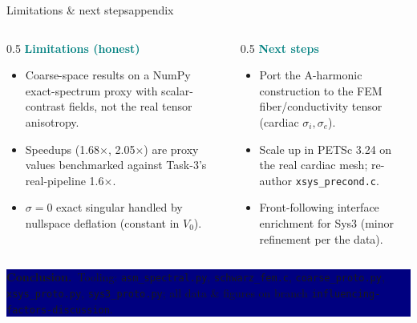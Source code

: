 \documentclass[aspectratio=169,9pt]{beamer}
\newcommand{\concl}[1]{\vfill\noindent\colorbox{navy}{\parbox{\dimexpr\textwidth-2\fboxsep\relax}{\color{white}\footnotesize\textbf{Conclusion.}\ #1}}}
\begin{document}
\begin{frame}{Limitations \& next steps}{appendix}
  \begin{columns}[T]
  \begin{column}{0.5\linewidth}\footnotesize
   \textcolor{teal}{\textbf{Limitations (honest)}}
   \begin{itemize}\setlength\itemsep{0.3em}
     \item Coarse-space results on a NumPy exact-spectrum proxy with scalar-contrast fields, not the real tensor anisotropy.
     \item Speedups (1.68$\times$, 2.05$\times$) are proxy values benchmarked against Task-3's real-pipeline 1.6$\times$.
     \item $\sigma{=}0$ exact singular handled by nullspace deflation (constant in $V_0$).
   \end{itemize}
  \end{column}
  \begin{column}{0.5\linewidth}\footnotesize
   \textcolor{teal}{\textbf{Next steps}}
   \begin{itemize}\setlength\itemsep{0.3em}
     \item Port the A-harmonic construction to the FEM fiber/conductivity tensor (cardiac $\sigma_i,\sigma_e$).
     \item Scale up in PETSc 3.24 on the real cardiac mesh; re-author \texttt{xsys\_precond.c}.
     \item Front-following interface enrichment for Sys3 (minor refinement per the data).
   \end{itemize}
  \end{column}
  \end{columns}
  \concl{Tooling: \texttt{asm\_spectral.py}, \texttt{schwarz\_fem.c}, \texttt{coarse\_proto.py}, \texttt{xsys\_proto.py}, \texttt{sys3\_proto.py}; all data \& figures on branch \texttt{influencing-factors-discussion}.}
\end{frame}
\end{document}
